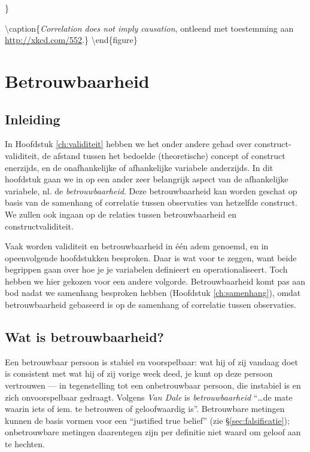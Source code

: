 \documentclass[
]{book}
\begin{document}
\}

\textbackslash caption\{\emph{Correlation does not imply causation}, ontleend met toestemming aan \url{http://xkcd.com/552}.\}\label{fig:xkcd552}
\textbackslash end\{figure\}

\hypertarget{ch:betrouwbaarheid}{%
\chapter{Betrouwbaarheid}\label{ch:betrouwbaarheid}}

\hypertarget{inleiding-6}{%
\section{Inleiding}\label{inleiding-6}}

In Hoofdstuk \ref{ch:validiteit} hebben we het onder andere gehad over
construct-validiteit, de afstand tussen het bedoelde (theoretische)
concept of construct enerzijds, en de onafhankelijke of afhankelijke
variabele anderzijds. In dit hoofdstuk gaan we in op een ander zeer
belangrijk aspect van de afhankelijke variabele, nl. de
\emph{betrouwbaarheid}. Deze betrouwbaarheid kan worden geschat op basis van
de samenhang of correlatie tussen observaties van hetzelfde construct.
We zullen ook ingaan op de relaties tussen betrouwbaarheid en
constructvaliditeit.

Vaak worden validiteit en betrouwbaarheid in één adem genoemd, en in opeenvolgende hoofdstukken besproken. Daar is wat voor te zeggen, want beide begrippen gaan over hoe je je variabelen definieert en operationaliseert. Toch hebben we hier gekozen voor een andere volgorde. Betrouwbaarheid komt pas aan bod nadat we samenhang besproken hebben (Hoofdstuk \ref{ch:samenhang}), omdat betrouwbaarheid gebaseerd is op de samenhang of correlatie tussen observaties.

\hypertarget{wat-is-betrouwbaarheid}{%
\section{Wat is betrouwbaarheid?}\label{wat-is-betrouwbaarheid}}

Een betrouwbaar persoon is stabiel en voorspelbaar: wat hij of zij
vandaag doet is consistent met wat hij of zij vorige week deed, je kunt
op deze persoon vertrouwen --- in tegenstelling tot een onbetrouwbaar
persoon, die instabiel is en zich onvoorspelbaar gedraagt. Volgens \emph{Van
Dale} is \emph{betrouwbaarheid} ``\ldots de mate waarin iets of iem. te betrouwen
of geloofwaardig is''. Betrouwbare metingen kunnen de basis vormen voor
een ``justified true belief'' (zie
§\ref{sec:falsificatie}); onbetrouwbare metingen daarentegen zijn
per definitie niet waard om geloof aan te hechten.
\end{document}
